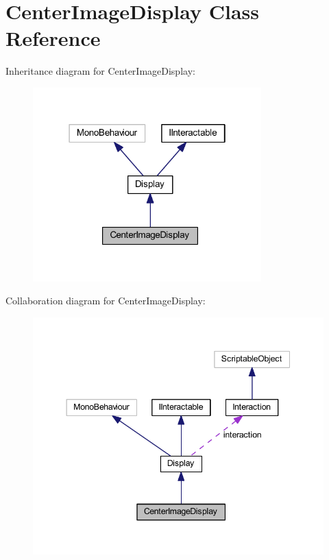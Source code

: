 \hypertarget{class_center_image_display}{}\section{Center\+Image\+Display Class Reference}
\label{class_center_image_display}


Inheritance diagram for Center\+Image\+Display\+:
\nopagebreak
\begin{figure}[H]
\begin{center}
\leavevmode
\includegraphics[width=250pt]{class_center_image_display__inherit__graph}
\end{center}
\end{figure}


Collaboration diagram for Center\+Image\+Display\+:
\nopagebreak
\begin{figure}[H]
\begin{center}
\leavevmode
\includegraphics[width=344pt]{class_center_image_display__coll__graph}
\end{center}
\end{figure}

